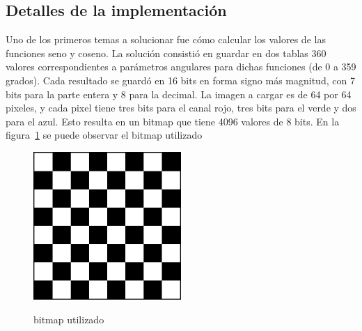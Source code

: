 \subsection{Detalles de la implementación}
Uno de los primeros temas a solucionar fue cómo calcular los valores de las funciones seno y coseno. La solución consistió en guardar en dos tablas $360$ valores correspondientes a parámetros angulares para dichas funciones (de 0 a 359 grados). Cada resultado se guardó en 16 bits en forma signo más magnitud, con 7 bits para la parte entera y 8 para la decimal. La imagen a cargar es de 64 por 64 pixeles, y cada pixel tiene tres bits para el canal rojo, tres bits para el verde y dos para el azul. Esto resulta en un bitmap que tiene 4096 valores de 8 bits. En la figura~\ref{fig:chess} se puede observar el bitmap utilizado 

\begin{figure}[h!]
 \caption{bitmap utilizado}
 \centering
   \includegraphics[width=0.5\textwidth]{chessw.png}
   \label{fig:chess}
\end{figure}   